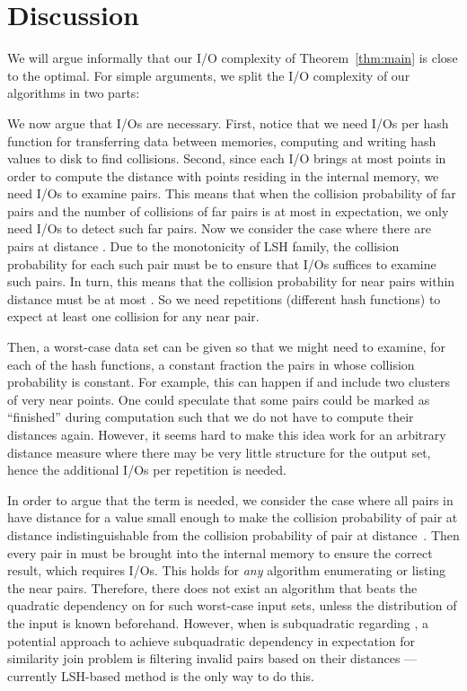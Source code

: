 \documentclass{llncs}
\begin{document}
\section{Discussion}\label{sec:exp}

We will argue informally that our I/O complexity of Theorem~\ref{thm:main} is
close to the optimal. For simple arguments, we split the I/O complexity of our
algorithms in two parts:



We now argue that  I/Os are necessary. 
First, notice that we need  I/Os per hash function for transferring data between memories, computing and writing hash values to disk to find collisions. 
Second, since each I/O brings at most  points in order to compute the distance with  points residing in the internal memory, we need  I/Os to examine  pairs. 
This means that when the collision probability of far pairs  and the number of collisions of far pairs is at most  in expectation, we only need  I/Os to detect such far pairs. 
Now we consider the case where there are  pairs at distance . 
Due to the monotonicity of LSH family, the collision probability for each such pair must be  to ensure that  I/Os suffices to examine such pairs.
In turn, this means that the collision probability for near pairs within distance  must be at most .
So we need  repetitions (different hash functions) to expect at least one collision for any near pair.

Then, a worst-case data set can be given so that we might need to examine, for each of the  hash functions, a constant fraction the pairs in  whose collision probability is constant.
For example, this can happen if  and  include two clusters of very near points.
One could speculate that some pairs could be marked as ``finished'' during computation such that we do not have to compute their distances again.
However, it seems hard to make this idea work for an arbitrary distance measure where there may be very little structure for the output set, hence the  additional I/Os per repetition is needed. 





In order to argue that the term  is needed, we consider the case where all pairs in  have distance  for a value  small enough to make the collision probability of pair at distance  indistinguishable from the collision probability of pair at distance~.
Then every pair in  must be brought into the internal memory to ensure the correct result, which requires  I/Os. 
This holds for \emph{any} algorithm enumerating or listing the near pairs. 
Therefore, there does not exist an algorithm that beats the quadratic dependency on  for such worst-case input sets, unless the distribution of the input is known beforehand. 
However, when  is subquadratic regarding , a potential approach to achieve subquadratic dependency in expectation for similarity join problem is filtering invalid pairs based on their distances --- currently LSH-based method is the only way to do this.
\end{document}

